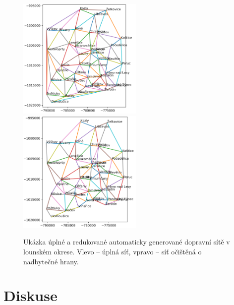 


\begin{figure}
\centering
\includegraphics[width=60mm]{pic/doprava_01.png}
\includegraphics[width=60mm]{pic/doprava_02.png}
\caption{Ukázka úplné a redukované automaticky generované dopravní sítě v lounském okrese. Vlevo -- úplná síť, vpravo -- síť očištěná o nadbytečné hrany.}
\label{dopravnisit}
\end{figure}




\section*{Diskuse}

